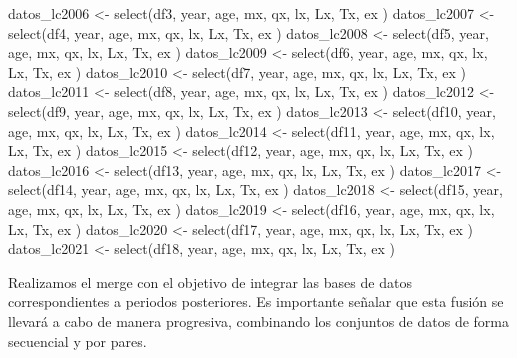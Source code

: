 \documentclass[
]{article}
\newenvironment{Shaded}{\begin{snugshade}}{\end{snugshade}}
\newcommand{\FunctionTok}[1]{\textcolor[rgb]{0.00,0.00,0.00}{#1}}
\newcommand{\NormalTok}[1]{#1}
\newcommand{\OtherTok}[1]{\textcolor[rgb]{0.56,0.35,0.01}{#1}}
\begin{document}
\begin{Shaded}
\begin{Highlighting}[]
\NormalTok{datos\_lc2006 }\OtherTok{\textless{}{-}} \FunctionTok{select}\NormalTok{(df3,  year, age, mx, qx, lx, Lx, Tx, ex )}
\NormalTok{datos\_lc2007 }\OtherTok{\textless{}{-}} \FunctionTok{select}\NormalTok{(df4,  year, age, mx, qx, lx, Lx, Tx, ex )}
\NormalTok{datos\_lc2008 }\OtherTok{\textless{}{-}} \FunctionTok{select}\NormalTok{(df5,  year, age, mx, qx, lx, Lx, Tx, ex )}
\NormalTok{datos\_lc2009 }\OtherTok{\textless{}{-}} \FunctionTok{select}\NormalTok{(df6, year, age, mx, qx, lx, Lx, Tx, ex )}
\NormalTok{datos\_lc2010 }\OtherTok{\textless{}{-}} \FunctionTok{select}\NormalTok{(df7, year, age, mx, qx, lx, Lx, Tx, ex )}
\NormalTok{datos\_lc2011 }\OtherTok{\textless{}{-}} \FunctionTok{select}\NormalTok{(df8, year, age, mx, qx, lx, Lx, Tx, ex )}
\NormalTok{datos\_lc2012 }\OtherTok{\textless{}{-}} \FunctionTok{select}\NormalTok{(df9, year, age, mx, qx, lx, Lx, Tx, ex )}
\NormalTok{datos\_lc2013 }\OtherTok{\textless{}{-}} \FunctionTok{select}\NormalTok{(df10, year, age, mx, qx, lx, Lx, Tx, ex )}
\NormalTok{datos\_lc2014 }\OtherTok{\textless{}{-}} \FunctionTok{select}\NormalTok{(df11, year, age, mx, qx, lx, Lx, Tx, ex )}
\NormalTok{datos\_lc2015 }\OtherTok{\textless{}{-}} \FunctionTok{select}\NormalTok{(df12, year, age, mx, qx, lx, Lx, Tx, ex )}
\NormalTok{datos\_lc2016 }\OtherTok{\textless{}{-}} \FunctionTok{select}\NormalTok{(df13, year, age, mx, qx, lx, Lx, Tx, ex )}
\NormalTok{datos\_lc2017 }\OtherTok{\textless{}{-}} \FunctionTok{select}\NormalTok{(df14, year, age, mx, qx, lx, Lx, Tx, ex )}
\NormalTok{datos\_lc2018 }\OtherTok{\textless{}{-}} \FunctionTok{select}\NormalTok{(df15, year, age, mx, qx, lx, Lx, Tx, ex )}
\NormalTok{datos\_lc2019 }\OtherTok{\textless{}{-}} \FunctionTok{select}\NormalTok{(df16, year, age, mx, qx, lx, Lx, Tx, ex )}
\NormalTok{datos\_lc2020 }\OtherTok{\textless{}{-}} \FunctionTok{select}\NormalTok{(df17, year, age, mx, qx, lx, Lx, Tx, ex )}
\NormalTok{datos\_lc2021 }\OtherTok{\textless{}{-}} \FunctionTok{select}\NormalTok{(df18, year, age, mx, qx, lx, Lx, Tx, ex )}
\end{Highlighting}
\end{Shaded}

Realizamos el merge con el objetivo de integrar las bases de datos
correspondientes a periodos posteriores. Es importante señalar que esta
fusión se llevará a cabo de manera progresiva, combinando los conjuntos
de datos de forma secuencial y por pares.
\end{document}
